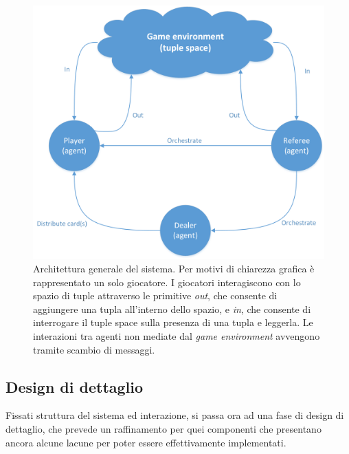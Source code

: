 \documentclass[a4paper,12pt]{article}
\begin{document}
\begin{figure}[H]
	\centering
	\includegraphics[width=\textwidth]{./img/general_architecture.png}
	\caption{Architettura generale del sistema. Per motivi di chiarezza grafica è rappresentato un solo giocatore. I giocatori interagiscono  con lo spazio di tuple attraverso le primitive \emph{out}, che consente di aggiungere una tupla all'interno dello spazio, e \emph{in}, che consente di interrogare il tuple space sulla presenza di una tupla e leggerla. Le interazioni tra agenti non mediate dal \emph{game environment} avvengono tramite scambio di messaggi.\label{general-architecture}}
\end{figure}


\subsection{Design di dettaglio} \label{design}

Fissati struttura del sistema ed interazione, si passa ora ad una fase di design di dettaglio, che prevede un raffinamento per quei componenti che presentano ancora alcune lacune per poter essere effettivamente implementati. 
\end{document}
